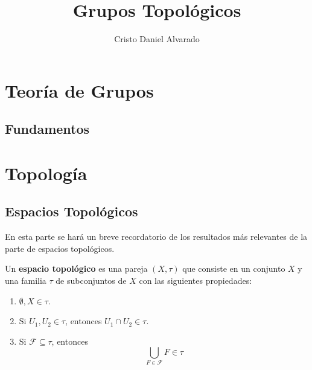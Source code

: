 \documentclass[12pt]{report}
\theoremstyle{largebreak}
\newcommand{\eul}[1]{\ensuremath{\mathscr{#1}}}
\begin{document}
    \title{Grupos Topológicos}
    \author{Cristo Daniel Alvarado}
    \maketitle

    \tableofcontents %

    
    \chapter{Teoría de Grupos}

    \section{Fundamentos}




    \chapter{Topología}
    
    \section{Espacios Topológicos}

    En esta parte se hará un breve recordatorio de los resultados más relevantes de la parte de espacios topológicos.

    \begin{mydef}
        Un \textbf{espacio topológico} es una pareja $(X,\tau)$ que consiste en un conjunto $X$ y una familia $\tau$ de subconjuntos de $X$ con las siguientes propiedades:
        \begin{enumerate}
            \item $\emptyset, X\in \tau$.
            \item Si $U_1,U_2\in \tau$, entonces $U_1\cap U_2\in \tau$.
            \item Si $\eul{F}\subseteq \tau$, entonces
            \begin{equation*}
                \bigcup_{F\in \eul{F}}F\in\tau
            \end{equation*}
        \end{enumerate}
    \end{mydef}
\end{document}
